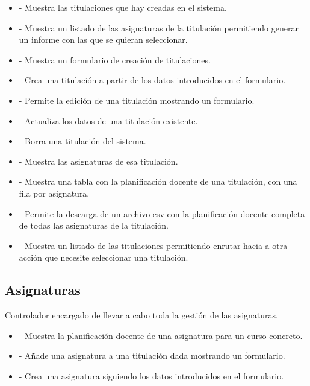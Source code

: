 \begin{itemize}
\item {} - Muestra las titulaciones que hay creadas en el sistema.
\item {} - Muestra un listado de las asignaturas de la titulación permitiendo generar un informe con las que se quieran seleccionar.
\item {} - Muestra un formulario de creación de titulaciones.
\item {} - Crea una titulación a partir de los datos introducidos en el formulario.
\item {} - Permite la edición de una titulación mostrando un formulario.
\item {} - Actualiza los datos de una titulación existente.
\item {} - Borra una titulación del sistema.
\item {} - Muestra las asignaturas de esa titulación.
\item {} - Muestra una tabla con la planificación docente de una titulación, con una fila por asignatura.
\item {} - Permite la descarga de un archivo csv con la planificación docente completa de todas las asignaturas de la titulación.
\item {} - Muestra un listado de las titulaciones permitiendo enrutar hacia a otra acción que necesite seleccionar una titulación.
\end{itemize}

\subsection{Asignaturas}
Controlador encargado de llevar a cabo toda la gestión de las asignaturas.

\begin{itemize}
\item {} - Muestra la planificación docente de una asignatura para un curso concreto.
\item {} - Añade una asignatura a una titulación dada mostrando un formulario.
\item {} - Crea una asignatura siguiendo los datos introducidos en el formulario.
\end{itemize}

